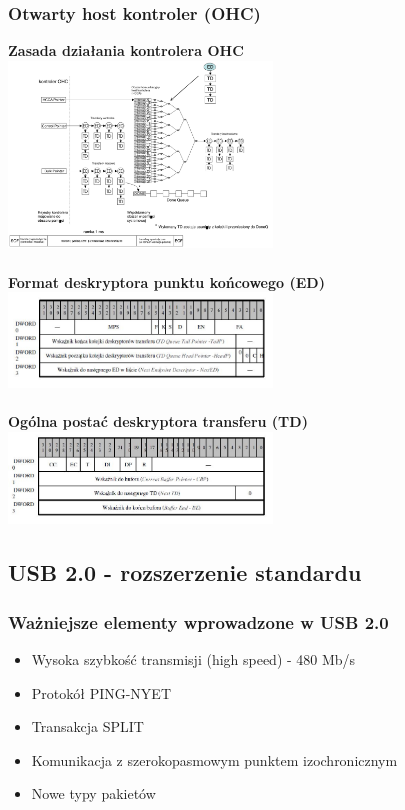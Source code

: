 	\subsubsection{Otwarty host kontroler (OHC)}
	\textbf{Zasada działania kontrolera OHC}\\
	\includegraphics[width=7cm]{./wyklady/USB_49_1.pdf}\\\\
	\textbf{Format deskryptora punktu końcowego (ED)}\\
	\includegraphics[width=7cm]{./wyklady/USB_50_1.jpg}\\\\
	\textbf{Ogólna postać deskryptora transferu (TD)}\\
	\includegraphics[width=7cm]{./wyklady/USB_51_1.jpg}
	
\subsection{USB 2.0 - rozszerzenie standardu}
	\subsubsection{Ważniejsze elementy wprowadzone w USB 2.0}
	\begin{itemize}
		\item Wysoka szybkość transmisji (high speed) - 480 Mb/s
		\item Protokół PING-NYET
		\item Transakcja SPLIT
		\item Komunikacja z szerokopasmowym punktem izochronicznym
		\item Nowe typy pakietów
	\end{itemize}
